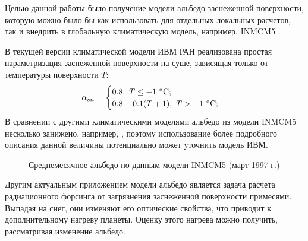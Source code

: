 \documentclass[a4paper, fontsize=14pt]{scrartcl}
\begin{document}
Целью данной работы было получение модели альбедо заснеженной поверхности, которую можно было бы как использовать для отдельных локальных расчетов, так и внедрить в глобальную климатическую модель, например, INMCM5 \cite{Volodin2017rus}.  

В текущей версии климатической модели ИВМ РАН реализована простая параметризация заснеженной поверхности на суше, зависящая только от температуры поверхности $T$: 
\begin{equation}
    \alpha_{sn} = \begin{cases}
                        0.8,~ T \leq -1 ~\degree \mathrm{C}; \\
                        0.8 - 0.1(T + 1), ~T > -1 ~\degree \mathrm{C};
                  \end{cases} \label{sysAlbOld}
\end{equation}
В сравнении с другими климатическими моделями альбедо из модели INMCM5 несколько занижено, например, \cite{Flanner2007, Gueymard2019}, поэтому использование более подробного описания данной величины потенциально может уточнить модель ИВМ. \sloppy 

\newpage
\begin{figure}[h]
    \caption{Среднемесячное альбедо по данным модели INMCM5 (март 1997 г.) \sloppy }
    \label{fig:imageAlbOld}
\end{figure}


Другим актуальным приложением модели альбедо является задача расчета радиационного форсинга от загрязнения заснеженной поверхности примесями. Выпадая на снег, они изменяют его оптические свойства, что приводит к дополнительному нагреву планеты. Оценку этого нагрева можно получить, рассматривая изменение альбедо. \sloppy 
\end{document}

